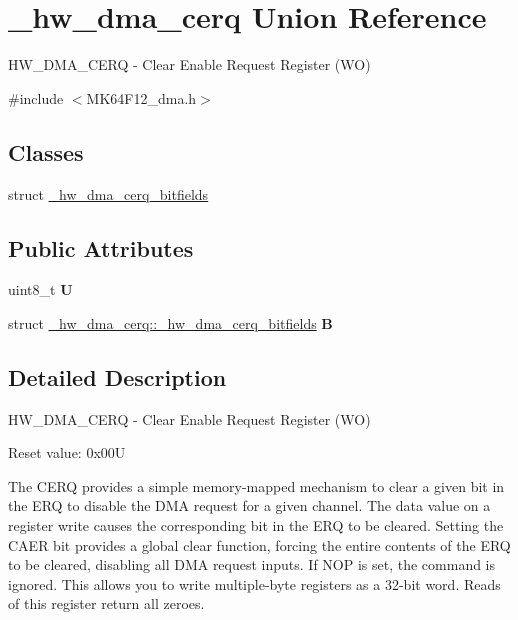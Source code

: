 \hypertarget{union__hw__dma__cerq}{}\section{\+\_\+hw\+\_\+dma\+\_\+cerq Union Reference}
\label{union__hw__dma__cerq}


H\+W\+\_\+\+D\+M\+A\+\_\+\+C\+E\+RQ -\/ Clear Enable Request Register (WO)  




{\ttfamily \#include $<$M\+K64\+F12\+\_\+dma.\+h$>$}

\subsection*{Classes}
\begin{DoxyCompactItemize}
\item 
struct \hyperlink{struct__hw__dma__cerq_1_1__hw__dma__cerq__bitfields}{\+\_\+hw\+\_\+dma\+\_\+cerq\+\_\+bitfields}
\end{DoxyCompactItemize}
\subsection*{Public Attributes}
\begin{DoxyCompactItemize}
\item 
uint8\+\_\+t {\bfseries U}\hypertarget{union__hw__dma__cerq_a30aa7208010e98b589cd909671d3ba38}{}\label{union__hw__dma__cerq_a30aa7208010e98b589cd909671d3ba38}

\item 
struct \hyperlink{struct__hw__dma__cerq_1_1__hw__dma__cerq__bitfields}{\+\_\+hw\+\_\+dma\+\_\+cerq\+::\+\_\+hw\+\_\+dma\+\_\+cerq\+\_\+bitfields} {\bfseries B}\hypertarget{union__hw__dma__cerq_ae6980dd54fed4466f75c3331f71edb64}{}\label{union__hw__dma__cerq_ae6980dd54fed4466f75c3331f71edb64}

\end{DoxyCompactItemize}


\subsection{Detailed Description}
H\+W\+\_\+\+D\+M\+A\+\_\+\+C\+E\+RQ -\/ Clear Enable Request Register (WO) 

Reset value\+: 0x00U

The C\+E\+RQ provides a simple memory-\/mapped mechanism to clear a given bit in the E\+RQ to disable the D\+MA request for a given channel. The data value on a register write causes the corresponding bit in the E\+RQ to be cleared. Setting the C\+A\+ER bit provides a global clear function, forcing the entire contents of the E\+RQ to be cleared, disabling all D\+MA request inputs. If N\+OP is set, the command is ignored. This allows you to write multiple-\/byte registers as a 32-\/bit word. Reads of this register return all zeroes. 

